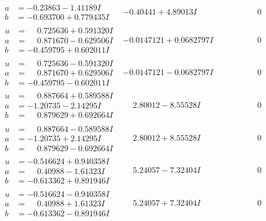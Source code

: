\documentclass[1p]{elsarticle_modified}
\theoremstyle{definition}
\begin{document}
$$\begin{array}{c|c|c}
\begin{aligned}
a &= -0.23863 - 1.41189 I \\
b &= -0.693700 + 0.779435 I\end{aligned}
 & -0.40441 + 4.89013 I & \phantom{-0.000000 } 0 \\ \hline\begin{aligned}
u &= \phantom{-}0.725636 + 0.591320 I \\
a &= \phantom{-}0.871670 - 0.629506 I \\
b &= -0.459795 + 0.602011 I\end{aligned}
 & -0.0147121 + 0.0682797 I & \phantom{-0.000000 } 0 \\ \hline\begin{aligned}
u &= \phantom{-}0.725636 - 0.591320 I \\
a &= \phantom{-}0.871670 + 0.629506 I \\
b &= -0.459795 - 0.602011 I\end{aligned}
 & -0.0147121 - 0.0682797 I & \phantom{-0.000000 } 0 \\ \hline\begin{aligned}
u &= \phantom{-}0.887664 + 0.589588 I \\
a &= -1.20735 - 2.14295 I \\
b &= \phantom{-}0.879629 + 0.692664 I\end{aligned}
 & \phantom{-}2.80012 - 8.55528 I & \phantom{-0.000000 } 0 \\ \hline\begin{aligned}
u &= \phantom{-}0.887664 - 0.589588 I \\
a &= -1.20735 + 2.14295 I \\
b &= \phantom{-}0.879629 - 0.692664 I\end{aligned}
 & \phantom{-}2.80012 + 8.55528 I & \phantom{-0.000000 } 0 \\ \hline\begin{aligned}
u &= -0.516624 + 0.940358 I \\
a &= \phantom{-}0.40988 - 1.61323 I \\
b &= -0.613362 + 0.891946 I\end{aligned}
 & \phantom{-}5.24057 - 7.32404 I & \phantom{-0.000000 } 0 \\ \hline\begin{aligned}
u &= -0.516624 - 0.940358 I \\
a &= \phantom{-}0.40988 + 1.61323 I \\
b &= -0.613362 - 0.891946 I\end{aligned}
 & \phantom{-}5.24057 + 7.32404 I & \phantom{-0.000000 } 0 \\ \hline\begin{aligned}

\end{aligned}
\end{array}$$
\end{document}
